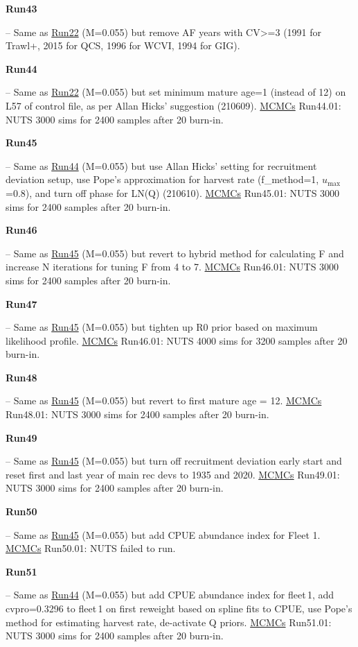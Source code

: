 \hypertarget{R43}{\textbf{Run43}} -- Same as \hyperlink{R22}{Run22} (M=0.055) but remove AF years with CV>=3 (1991 for Trawl+, 2015 for QCS, 1996 for WCVI, 1994 for GIG).

\hypertarget{R44}{\textbf{Run44}} -- Same as \hyperlink{R22}{Run22} (M=0.055) but set minimum mature age=1 (instead of 12) on L57 of control file, as per Allan Hicks' suggestion (210609). \underline{MCMCs} Run44.01: NUTS 3000 sims for 2400 samples after 20\pc{} burn-in.

\hypertarget{R45}{\textbf{Run45}} -- Same as \hyperlink{R44}{Run44} (M=0.055) but use Allan Hicks' setting for recruitment deviation setup, use Pope's approximation for harvest rate (f\_method=1, $u_\mathrm{max}$=0.8), and turn off phase for LN(Q) (210610). \underline{MCMCs} Run45.01: NUTS 3000 sims for 2400 samples after 20\pc{} burn-in.

\hypertarget{R46}{\textbf{Run46}} -- Same as \hyperlink{R45}{Run45} (M=0.055) but revert to hybrid method for calculating F and increase N iterations for tuning F from 4 to 7. \underline{MCMCs} Run46.01: NUTS 3000 sims for 2400 samples after 20\pc{} burn-in.

\hypertarget{R47}{\textbf{Run47}} -- Same as \hyperlink{R45}{Run45} (M=0.055) but tighten up R0 prior based on maximum likelihood profile. \underline{MCMCs} Run46.01: NUTS 4000 sims for 3200 samples after 20\pc{} burn-in.

\hypertarget{R48}{\textbf{Run48}} -- Same as \hyperlink{R45}{Run45} (M=0.055) but revert to first mature age = 12. \underline{MCMCs} Run48.01: NUTS 3000 sims for 2400 samples after 20\pc{} burn-in.

\hypertarget{R49}{\textbf{Run49}} -- Same as \hyperlink{R45}{Run45} (M=0.055) but turn off recruitment deviation early start and reset first and last year of main rec devs to 1935 and 2020. \underline{MCMCs} Run49.01: NUTS 3000 sims for 2400 samples after 20\pc{} burn-in.

\hypertarget{R50}{\textbf{Run50}} -- Same as \hyperlink{R45}{Run45} (M=0.055) but add CPUE abundance index for Fleet 1. \underline{MCMCs} Run50.01: NUTS failed to run.

\hypertarget{R51}{\textbf{Run51}} -- Same as \hyperlink{R44}{Run44} (M=0.055) but add CPUE abundance index for fleet\,1, add cvpro=0.3296 to fleet\,1 on first reweight based on spline fits to CPUE, use Pope's method for estimating harvest rate, de-activate Q priors. \underline{MCMCs} Run51.01: NUTS 3000 sims for 2400 samples after 20\pc{} burn-in.

